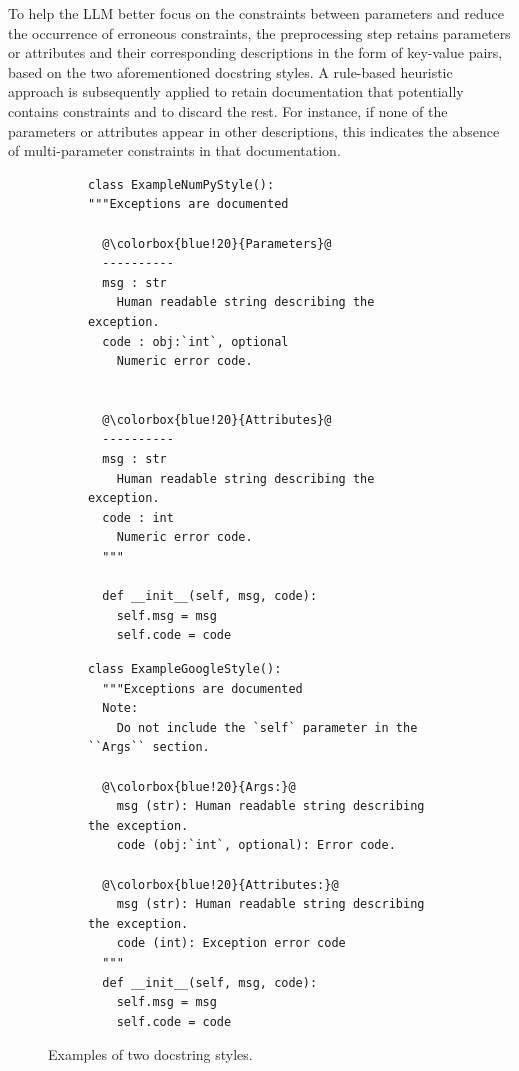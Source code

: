 To help the LLM better focus on the constraints between parameters and reduce the occurrence of erroneous constraints, the preprocessing step retains parameters or attributes and their corresponding descriptions in the form of key-value pairs, based on the two aforementioned docstring styles. A rule-based heuristic approach is subsequently applied to retain documentation that potentially contains constraints and to discard the rest. For instance, if none of the parameters or attributes appear in other descriptions, this indicates the absence of multi-parameter constraints in that documentation.


\begin{figure}[t]
  \centering
	\vspace{2mm}
    \begin{subfigure}[t]{0.49\linewidth}
        \begin{tcolorbox}[equal height group=docstringstyles,valign=top,colback=Emerald!10,colframe=cyan!40!black,title=\textbf{NumPy Style Docstrings}]
\begin{lstlisting}[escapechar=@]
class ExampleNumPyStyle():
"""Exceptions are documented

  @\colorbox{blue!20}{Parameters}@
  ----------
  msg : str
    Human readable string describing the exception.
  code : obj:`int`, optional 
    Numeric error code.

    
  @\colorbox{blue!20}{Attributes}@
  ----------
  msg : str
    Human readable string describing the exception.
  code : int
    Numeric error code.
  """

  def __init__(self, msg, code):
    self.msg = msg
    self.code = code
\end{lstlisting}
        \end{tcolorbox}
        \label{fig:numpy}
    \end{subfigure}
    \begin{subfigure}[t]{0.49\linewidth}
\begin{tcolorbox}[equal height group=docstringstyles,valign=top,colback=Salmon!20, colframe=Salmon!90!Black,title=\textbf{Google Style Docstrings}]
\begin{lstlisting}[escapechar=@]
class ExampleGoogleStyle():
  """Exceptions are documented
  Note:
    Do not include the `self` parameter in the ``Args`` section.
        
  @\colorbox{blue!20}{Args:}@
    msg (str): Human readable string describing the exception.
    code (obj:`int`, optional): Error code.

  @\colorbox{blue!20}{Attributes:}@    
    msg (str): Human readable string describing the exception.
    code (int): Exception error code
  """
  def __init__(self, msg, code):
    self.msg = msg
    self.code = code
\end{lstlisting}
\end{tcolorbox}
    \label{fig:google}
    \end{subfigure}
    \caption{Examples of two docstring styles.}
    \label{fig:docstring}
    \vspace{-10pt}
\end{figure}
